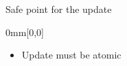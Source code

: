 \begin{frame}[t,label=suspend]{Safe point for the update}
\begin{textblock*}{0mm}[0,0]
%
\end{textblock*}%
\begin{itemize}%
\item Update must be atomic

\end{itemize}
\end{frame}
